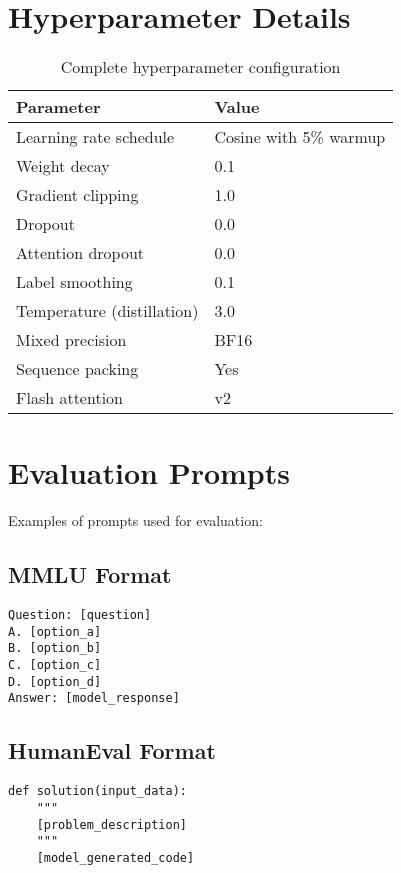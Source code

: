 \documentclass[11pt,a4paper]{article}
\begin{document}



\appendix

\section{Hyperparameter Details}

\begin{table}[h]
\centering
\caption{Complete hyperparameter configuration}
\begin{tabular}{ll}
\toprule
Parameter & Value \\
\midrule
Learning rate schedule & Cosine with 5\% warmup \\
Weight decay & 0.1 \\
Gradient clipping & 1.0 \\
Dropout & 0.0 \\
Attention dropout & 0.0 \\
Label smoothing & 0.1 \\
Temperature (distillation) & 3.0 \\
Mixed precision & BF16 \\
Sequence packing & Yes \\
Flash attention & v2 \\
\bottomrule
\end{tabular}
\end{table}

\section{Evaluation Prompts}

Examples of prompts used for evaluation:

\subsection{MMLU Format}
\begin{lstlisting}
Question: [question]
A. [option_a]
B. [option_b]
C. [option_c]
D. [option_d]
Answer: [model_response]
\end{lstlisting}

\subsection{HumanEval Format}
\begin{lstlisting}
def solution(input_data):
    """
    [problem_description]
    """
    [model_generated_code]
\end{lstlisting}
\end{document}
